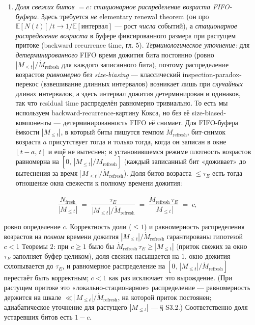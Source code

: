 \documentclass[12pt]{iopart}
\begin{document}
\begin{enumerate}
\item

  \emph{Доля свежих битов \(= c\): стационарное распределение возраста FIFO-буфера.} Здесь требуется \emph{не} elementary renewal theorem (он про \(\mathbb E[N(t)]/t \to 1/\mathbb E[\text{интервал}]\) --- рост \emph{числа} событий), а \emph{стационарное распределение возраста} в буфере фиксированного размера при растущем притоке (backward recurrence time, \cite{Cox1962} гл. 5). \emph{Терминологическое уточнение:} для \emph{детерминированного} FIFO время дожития бита постоянно (ровно \(|M_{\le t}|/\dot M_{\text{refresh}}\) для каждого записанного бита), поэтому распределение возрастов \emph{равномерно без size-biasing} --- классический inspection-paradox-перекос (взвешивание длинных интервалов) возникает лишь при \emph{случайных} длинах интервалов, а здесь интервал дожития детерминирован и одинаков, так что residual time распределён равномерно тривиально. То есть мы используем backward-recurrence-картину Кокса, но \emph{без} её size-biased-компоненты --- детерминированность FIFO её снимает. Для FIFO-буфера ёмкости \(|M_{\le t}|\), в который биты пишутся темпом \(\dot M_{\text{refresh}}\), бит-снимок возраста \(a\) присутствует тогда и только тогда, когда он записан в окне \([t-a,\,t]\) и ещё не вытеснен; в установившемся режиме плотность возрастов равномерна на \([0,\,|M_{\le t}|/\dot M_{\text{refresh}}]\) (каждый записанный бит «доживает» до вытеснения за время \(|M_{\le t}|/\dot M_{\text{refresh}}\)). Доля битов возраста \(\le \tau_E\) есть тогда отношение окна свежести к полному времени дожития:

\end{enumerate}



\begin{equation}\frac{N_{\text{fresh}}}{|M_{\le t}|} \;=\; \frac{\tau_E}{|M_{\le t}|/\dot M_{\text{refresh}}} \;=\; \frac{\dot M_{\text{refresh}}\,\tau_E}{|M_{\le t}|} \;=\; c, \tag{S2.2b}\end{equation}



ровно определение \(c\). Корректность доли (\(\le 1\)) и равномерность распределения возрастов на \emph{полном} времени дожития \(|M_{\le t}|/\dot M_{\text{refresh}}\) гарантированы гипотезой \(c < 1\) Теоремы 2: при \(c \ge 1\) было бы \(\dot M_{\text{refresh}}\,\tau_E \ge |M_{\le t}|\) (приток свежих за окно \(\tau_E\) заполняет буфер целиком), доля свежих насыщается на \(1\), окно дожития схлопывается до \(\tau_E\), и равномерное распределение на \([0,\,|M_{\le t}|/\dot M_{\text{refresh}}]\) перестаёт быть корректным; \(c < 1\) как раз исключает это вырождение. (При растущем притоке это «локально-стационарное» распределение --- равномерность держится на шкале \(\ll |M_{\le t}|/\dot M_{\text{refresh}}\), на которой приток постоянен; адиабатическое уточнение для растущего \(|M_{\le t}|\) --- § S3.2.) Соответственно доля устаревших битов есть \(1-c\).
\end{document}
